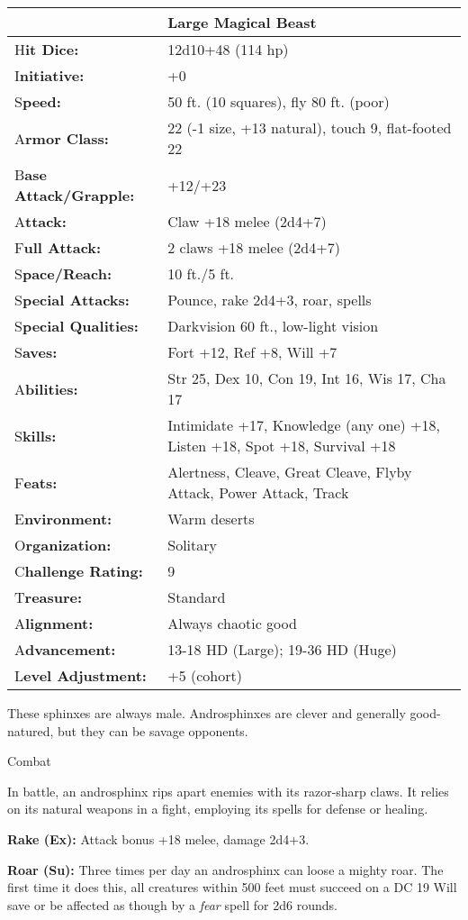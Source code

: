\documentclass{article}
\begin{document}
\begin{tabular}{|>{\raggedright}p{91pt}|>{\raggedright}p{204pt}|}
\hline
  & Large Magical Beast\tabularnewline
\hline
H\textbf{it Dice:} & 12d10+48 (114 hp)\tabularnewline
\hline
I\textbf{nitiative:} & +0\tabularnewline
\hline
S\textbf{peed:} & 50 ft. (10 squares), fly 80 ft. (poor)\tabularnewline
\hline
A\textbf{rmor Class:} & 22 (-1 size, +13 natural), touch 9, flat-footed 22\tabularnewline
\hline
B\textbf{ase Attack/Grapple:} & +12/+23\tabularnewline
\hline
A\textbf{ttack:} & Claw +18 melee (2d4+7)\tabularnewline
\hline
F\textbf{ull Attack:} & 2 claws +18 melee (2d4+7)\tabularnewline
\hline
S\textbf{pace/Reach:} & 10 ft./5 ft.\tabularnewline
\hline
S\textbf{pecial Attacks:} & Pounce, rake 2d4+3, roar, spells\tabularnewline
\hline
S\textbf{pecial Qualities:} & Darkvision 60 ft., low-light vision\tabularnewline
\hline
S\textbf{aves:} & Fort +12, Ref +8, Will +7\tabularnewline
\hline
A\textbf{bilities:} & Str 25, Dex 10, Con 19, Int 16, Wis 17, Cha 17\tabularnewline
\hline
S\textbf{kills:} & Intimidate +17, Knowledge (any one) +18, Listen +18, Spot +18, 
Survival +18\tabularnewline
\hline
F\textbf{eats:} & Alertness, Cleave, Great Cleave, Flyby Attack, Power Attack, 
Track\tabularnewline
\hline
E\textbf{nvironment:} & Warm deserts\tabularnewline
\hline
O\textbf{rganization:} & Solitary\tabularnewline
\hline
C\textbf{hallenge Rating:} & 9\tabularnewline
\hline
T\textbf{reasure:} & Standard\tabularnewline
\hline
A\textbf{lignment:} & Always chaotic good\tabularnewline
\hline
A\textbf{dvancement:} & 13-18 HD (Large); 19-36 HD (Huge)\tabularnewline
\hline
L\textbf{evel Adjustment:} & +5 (cohort)\tabularnewline
\hline
\end{tabular}

These sphinxes are always male. Androsphinxes are clever and generally good-natured, 
but they can be savage opponents. 

Combat

In battle, an androsphinx rips apart enemies with its razor-sharp claws. It relies 
on its natural weapons in a fight, employing its spells for defense or healing.

\textbf{Rake (Ex): }Attack bonus +18 melee, damage 2d4+3.

\textbf{Roar (Su): }Three times per day an androsphinx can loose a mighty roar. 
The first time it does this, all creatures within 500 feet must succeed on a DC 
19 Will save or be affected as though by a \textit{fear }spell for 2d6 rounds.
\end{document}

